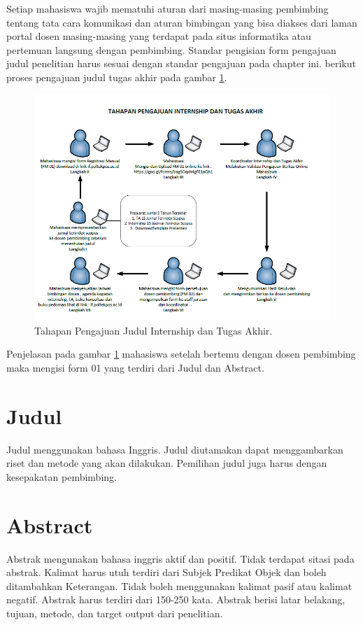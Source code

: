 Setiap mahasiswa wajib mematuhi aturan dari masing-masing pembimbing tentang tata cara komunikasi dan aturan bimbingan yang bisa diakses dari laman portal dosen masing-masing yang terdapat pada situs informatika atau pertemuan langsung dengan pembimbing. Standar pengisian form pengajuan judul penelitian harus sesuai dengan standar pengajuan pada chapter ini. berikut proses pengajuan judul tugas akhir pada gambar \ref{figure:P1}.
\begin{figure}[ht]
	\centerline{\includegraphics[width=1\textwidth]{figures/pengajuan.png}}
	\caption{Tahapan Pengajuan Judul Internship dan Tugas Akhir.}
	\label{figure:P1}
	\end{figure}
Penjelasan pada gambar  \ref{figure:P1} mahasiswa setelah bertemu dengan dosen pembimbing maka mengisi form 01 yang terdiri dari Judul dan Abstract.
\section{Judul}
Judul menggunakan bahasa Inggris. Judul diutamakan dapat menggambarkan riset dan metode yang akan dilakukan. Pemilihan judul juga harus dengan kesepakatan pembimbing. 

\section{Abstract}
Abstrak mengunakan bahasa inggris aktif dan positif. Tidak terdapat sitasi pada abstrak. Kalimat harus utuh terdiri dari Subjek Predikat Objek dan boleh ditambahkan Keterangan. Tidak boleh menggunakan kalimat pasif atau kalimat negatif. Abstrak harus terdiri dari 150-250 kata. Abstrak berisi latar belakang, tujuan, metode, dan target output dari penelitian.

